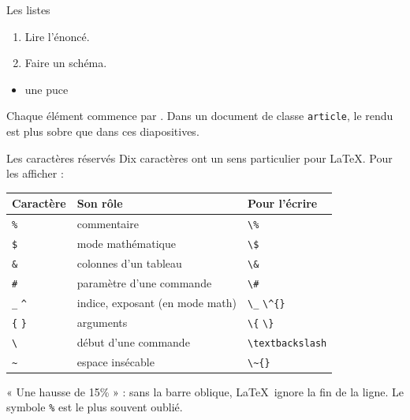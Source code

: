 \begin{frame}[fragile]{Les listes}
\begin{CodeRendu}[title={Numérotée ou à puces}]
\begin{enumerate}
  \item Lire l'énoncé.
  \item Faire un schéma.
\end{enumerate}
\begin{itemize}
  \item une puce
\end{itemize}
\end{CodeRendu}
  \small Chaque élément commence par . Dans un document de classe
  \texttt{article}, le rendu est plus sobre que dans ces diapositives.
\end{frame}

\begin{frame}{Les caractères réservés}
  \small Dix caractères ont un sens particulier pour \LaTeX. Pour les
  afficher :
  \begin{center}
  \begin{tabular}{lll}
    \toprule
    Caractère & Son rôle & Pour l'écrire \\
    \midrule
    \texttt{\%} & commentaire & \texttt{\textbackslash\%} \\
    \texttt{\$} & mode mathématique & \texttt{\textbackslash\$} \\
    \texttt{\&} & colonnes d'un tableau & \texttt{\textbackslash\&} \\
    \texttt{\#} & paramètre d'une commande & \texttt{\textbackslash\#} \\
    \texttt{\_} \quad \texttt{\^{}} & indice, exposant (en mode math) &
      \texttt{\textbackslash\_} \quad \texttt{\textbackslash\^{}\{\}} \\
    \texttt{\{} \quad \texttt{\}} & arguments & \texttt{\textbackslash\{}
      \quad \texttt{\textbackslash\}} \\
    \texttt{\textbackslash} & début d'une commande &
      \texttt{\textbackslash textbackslash} \\
    \texttt{\~{}} & espace insécable & \texttt{\textbackslash\~{}\{\}} \\
    \bottomrule
  \end{tabular}
  \end{center}
  \begin{AuTableau}
    \small « Une hausse de 15\% » : sans la barre oblique, \LaTeX\
    ignore la fin de la ligne. Le symbole \texttt{\%} est le plus souvent
    oublié.
  \end{AuTableau}
\end{frame}

